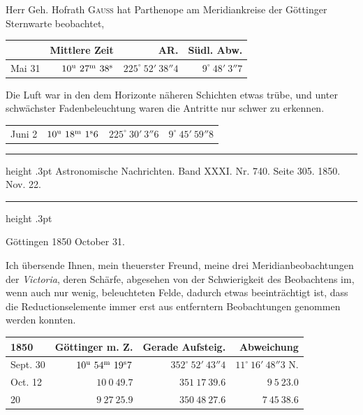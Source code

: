 Herr Geh. Hofrath \textsc{Gauss} hat Parthenope am Meridiankreise der Göttinger Sternwarte beobachtet,

\begin{center}
\setlength{\tabcolsep}{4pt}
\begin{tabular}{l|r|r|r}
 & Mittlere Zeit & AR. & Südl. Abw. \\\hline
Mai 31 & $10^{\rm u}\ 27^{\rm m}\ 38^{\rm s}$ & $225^\circ\ 52'\ 38''4$ & $9^\circ\ 48'\ 3''7$ \\
\end{tabular}
\end{center}

Die Luft war in den dem Horizonte näheren Schichten etwas trübe, und unter schwächster Fadenbeleuchtung waren die Antritte nur schwer zu erkennen.

\begin{center}
\setlength{\tabcolsep}{4pt}
\begin{tabular}{l|r|r|r}
Juni 2 & $10^{\rm u}\ 18^{\rm m}\ 1^{\rm s}6$ & $225^\circ\ 30'\ 3''6$ & $9^\circ\ 45'\ 59''8$ \\
\end{tabular}
\end{center}

\par\bigskip
{}
\hypertarget{native-483-victoria}{}
\begin{center}
\parbox{.77\linewidth}{%
\centering\small
\hrule height .3pt\relax\vspace{2.5pt}
Astronomische Nachrichten. Band XXXI. Nr. 740. Seite 305. 1850. Nov. 22.\par
\vspace{2.5pt}\hrule height .3pt\relax
}
\end{center}
\begin{flushright}Göttingen 1850 October 31.\end{flushright}

Ich übersende Ihnen, mein theuerster Freund, meine drei Meridianbeobachtungen der \emph{Victoria}, deren Schärfe, abgesehen von der Schwierigkeit des Beobachtens im, wenn auch nur wenig, beleuchteten Felde, dadurch etwas beeinträchtigt ist, dass die Reductionselemente immer erst aus entferntern Beobachtungen genommen werden konnten.

\begin{center}
\setlength{\tabcolsep}{3pt}
\begin{tabular}{l|r|r|r}
1850 & Göttinger m. Z. & Gerade Aufsteig. & Abweichung \\\hline
Sept. 30 & $10^{\rm u}\ 54^{\rm m}\ 19^{\rm s}7$ & $352^\circ\ 52'\ 43''4$ & $11^\circ\ 16'\ 48''3$ N. \\
Oct. 12 & $10\ 0\ 49.7$ & $351\ 17\ 39.6$ & $9\ 5\ 23.0$ \\
\hfill 20 & $9\ 27\ 25.9$ & $350\ 48\ 27.6$ & $7\ 45\ 38.6$ \\
\end{tabular}
\end{center}
